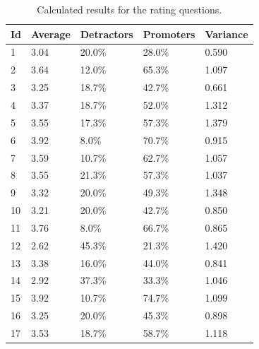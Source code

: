 \documentclass[a4paper,12pt]{article}
\begin{document}
    \begin{table}[!htbp]
        \begin{center}
            \begin{tabularx}{\textwidth}{lllll}
                \toprule
                Id & Average & Detractors & Promoters & Variance \\
                \midrule
                1  & 3.04    & 20.0\%     & 28.0\%    & 0.590    \\
                2  & 3.64    & 12.0\%     & 65.3\%    & 1.097    \\
                3  & 3.25    & 18.7\%     & 42.7\%    & 0.661    \\
                4  & 3.37    & 18.7\%     & 52.0\%    & 1.312    \\
                5  & 3.55    & 17.3\%     & 57.3\%    & 1.379    \\
                6  & 3.92    & 8.0\%      & 70.7\%    & 0.915    \\
                7  & 3.59    & 10.7\%     & 62.7\%    & 1.057    \\
                8  & 3.55    & 21.3\%     & 57.3\%    & 1.037    \\
                9  & 3.32    & 20.0\%     & 49.3\%    & 1.348    \\
                10 & 3.21    & 20.0\%     & 42.7\%    & 0.850    \\
                11 & 3.76    & 8.0\%      & 66.7\%    & 0.865    \\
                12 & 2.62    & 45.3\%     & 21.3\%    & 1.420    \\
                13 & 3.38    & 16.0\%     & 44.0\%    & 0.841    \\
                14 & 2.92    & 37.3\%     & 33.3\%    & 1.046    \\
                15 & 3.92    & 10.7\%     & 74.7\%    & 1.099    \\
                16 & 3.25    & 20.0\%     & 45.3\%    & 0.898    \\
                17 & 3.53    & 18.7\%     & 58.7\%    & 1.118    \\
                \bottomrule
            \end{tabularx}
        \end{center}
        \caption{\label{tab:ratingquestionresultstable} Calculated results for the rating questions.}
    \end{table}
\end{document}
